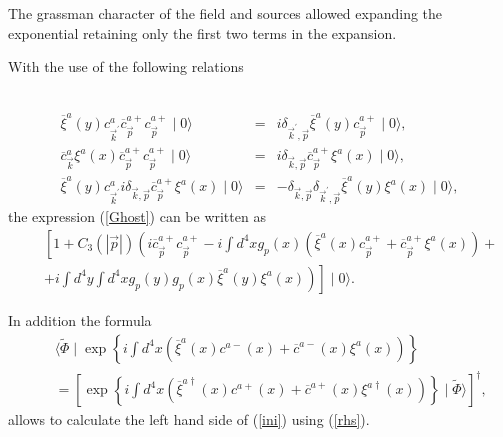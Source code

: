 \documentclass[12pt,letterpaper]{report}
\begin{document}
The grassman character of the field and sources allowed expanding
the exponential retaining only the first two terms in the
expansion.

With the use of the following relations

{\
\begin{eqnarray}
\overline{\xi }^a\left(y\right) c_{\vec{k}^{\prime
}}^a\overline{c}_{\vec{p} }^{a+}c_{\vec{p}}^{a+}\mid 0\rangle
&=&i\delta _{\vec{k}^{\prime },\vec{p}} \overline{\xi }^a\left(
y\right) c_{\vec{p}}^{a+}\mid 0\rangle, \nonumber
\\ \overline{c}_{\vec{k}}^a\xi ^a\left(x\right)
\overline{c}_{\vec{p}}^{a+}c_{ \vec{p}}^{a+}\mid 0\rangle
&=&i\delta _{\vec{k},\vec{p}}\overline{c}_{\vec{p} }^{a+}\xi
^a\left(x\right) \mid 0\rangle, \nonumber \\ \overline{\xi
}^a\left(y\right) c_{\vec{k}^{\prime }}^ai\delta _{\vec{k},
\vec{p}}\overline{c}_{\vec{p}}^{a+}\xi ^a\left(x\right) \mid
0\rangle &=&-\delta _{\vec{k},\vec{p}}\delta _{\vec{k}^{\prime
},\vec{p}}\overline{ \xi }^a\left(y\right) \xi ^a\left(x\right)
\mid 0\rangle,
\end{eqnarray}
}the expression (\ref{Ghost}) can be written as
\begin{eqnarray}
&&\left[ 1+C_3\left(\left| \vec{p}\right| \right) \left(
i\overline{c}_{ \vec{p}}^{a+}c_{\vec{p}}^{a+}-i\int d^4xg_p\left(
x\right) \left(\overline{ \xi }^a\left(x\right)
c_{\vec{p}}^{a+}+\overline{c}_{\vec{p}}^{a+}\xi ^a\left(x\right)
\right) \right. \right. + \nonumber \\ &&\left. \left. +i\int
d^4y\int d^4xg_p\left(y\right) g_p\left(x\right) \overline{\xi
}^a\left(y\right) \xi ^a\left(x\right) \right) \right] \mid
0\rangle. \label{rhs}
\end{eqnarray}

In addition the formula
\begin{eqnarray}
&&\langle \widetilde{\Phi }\mid \exp \left\{ i\int d^4x\left(
\overline{\xi } ^a\left(x\right) c^{a-}\left(x\right)
+\overline{c}^{a-}\left(x\right) \xi ^a\left(x\right) \right)
\right\} \nonumber \\ &&=\left[ \exp \left\{ i\int d^4x\left(
\overline{\xi }^{a\dagger }\left(x\right) c^{a+}\left(x\right)
+\overline{c}^{a+}\left(x\right) \xi ^{a\dagger }\left(x\right)
\right) \right\} \mid \widetilde{\Phi }\rangle \right] ^{\dagger
}, \label{rsh1}
\end{eqnarray}
allows to calculate the left hand side of (\ref{ini}) using
(\ref{rhs}).
\end{document}
